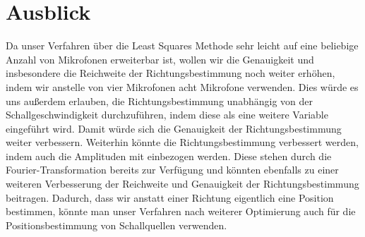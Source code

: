 \section{Ausblick} 
Da unser Verfahren über die Least Squares Methode sehr leicht auf eine beliebige Anzahl von Mikrofonen erweiterbar ist, wollen wir die Genauigkeit und insbesondere die Reichweite der Richtungsbestimmung noch weiter erhöhen, indem wir anstelle von vier Mikrofonen acht Mikrofone verwenden. Dies würde es uns außerdem erlauben, die Richtungsbestimmung unabhängig von der Schallgeschwindigkeit  durchzuführen, indem diese als eine weitere Variable eingeführt wird. Damit würde sich die Genauigkeit der Richtungsbestimmung weiter verbessern.
Weiterhin könnte die Richtungsbestimmung verbessert werden, indem auch die Amplituden mit einbezogen werden. Diese stehen durch die Fourier-Transformation bereits zur Verfügung und könnten ebenfalls zu einer weiteren Verbesserung der Reichweite und Genauigkeit der Richtungsbestimmung beitragen.
Dadurch, dass wir anstatt einer Richtung eigentlich eine Position bestimmen, könnte man unser Verfahren nach weiterer Optimierung auch für die Positionsbestimmung von Schallquellen verwenden.
